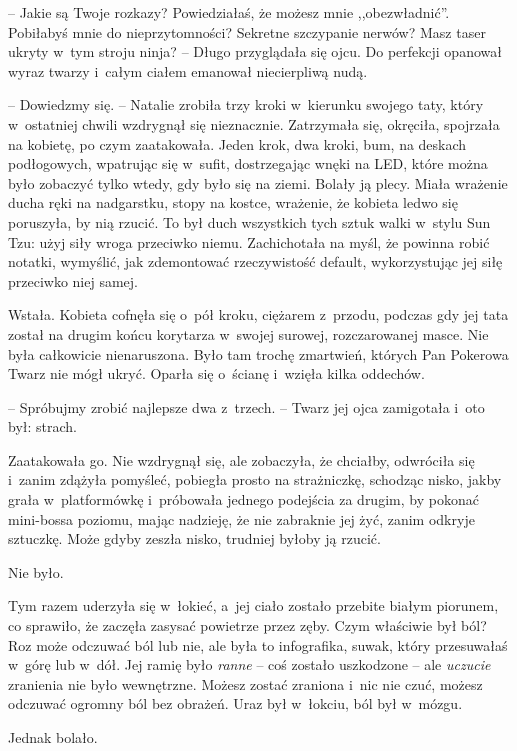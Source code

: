 \documentclass[oneside,polish,11pt,sfheadings]{mwbk}
\begin{document}
-- Jakie są Twoje rozkazy? Powiedziałaś, że możesz mnie ,,obezwładnić''.
Pobiłabyś mnie do nieprzytomności? Sekretne szczypanie nerwów? Masz
taser ukryty w~tym stroju ninja? -- Długo przyglądała się ojcu. Do
perfekcji opanował wyraz twarzy i~całym ciałem emanował niecierpliwą
nudą.

-- Dowiedzmy się. -- Natalie zrobiła trzy kroki w~kierunku swojego taty,
który w~ostatniej chwili wzdrygnął się nieznacznie. Zatrzymała się,
okręciła, spojrzała na kobietę, po czym zaatakowała. Jeden krok, dwa
kroki, bum, na deskach podłogowych, wpatrując się w~sufit, dostrzegając
wnęki na LED, które można było zobaczyć tylko wtedy, gdy było się na
ziemi. Bolały ją plecy. Miała wrażenie ducha ręki na nadgarstku, stopy
na kostce, wrażenie, że kobieta ledwo się poruszyła, by nią rzucić. To
był duch wszystkich tych sztuk walki w~stylu Sun Tzu: użyj siły wroga
przeciwko niemu. Zachichotała na myśl, że powinna robić notatki,
wymyślić, jak zdemontować rzeczywistość default, wykorzystując jej siłę
przeciwko niej samej.

Wstała. Kobieta cofnęła się o~pół kroku, ciężarem z~przodu, podczas gdy
jej tata został na drugim końcu korytarza w~swojej surowej,
rozczarowanej masce. Nie była całkowicie nienaruszona. Było tam trochę
zmartwień, których Pan Pokerowa Twarz nie mógł ukryć. Oparła się o~ścianę i~wzięła kilka oddechów.

-- Spróbujmy zrobić najlepsze dwa z~trzech. -- Twarz jej ojca zamigotała i~oto był: strach.

Zaatakowała go. Nie wzdrygnął się, ale zobaczyła, że chciałby, odwróciła
się i~zanim zdążyła pomyśleć, pobiegła prosto na strażniczkę, schodząc
nisko, jakby grała w~platformówkę i~próbowała jednego podejścia za
drugim, by pokonać mini-bossa poziomu, mając nadzieję, że nie zabraknie
jej żyć, zanim odkryje sztuczkę. Może gdyby zeszła nisko, trudniej
byłoby ją rzucić.

Nie było.

Tym razem uderzyła się w~łokieć, a~jej ciało zostało przebite białym
piorunem, co sprawiło, że zaczęła zasysać powietrze przez zęby. Czym
właściwie był ból? Roz może odczuwać ból lub nie, ale była to
infografika, suwak, który przesuwałaś w~górę lub w~dół. Jej ramię było
\textit{ranne} -- coś zostało uszkodzone -- ale \textit{uczucie} zranienia nie
było wewnętrzne. Możesz zostać zraniona i~nic nie czuć, możesz odczuwać
ogromny ból bez obrażeń. Uraz był w~łokciu, ból był w~mózgu.

Jednak bolało.
\end{document}
